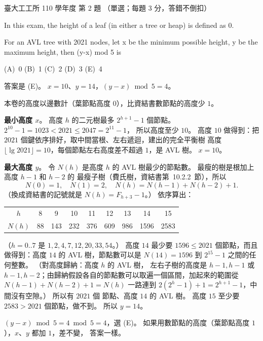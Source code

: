 \begin{pastexam}[label={px:ntu-110-ie-ds-02}]{臺大工工所 110 學年度 第 2 題}
（單選；每題 3 分，答錯不倒扣）

In this exam, the height of a leaf (in either a tree or heap) is defined as 0.

For an AVL tree with 2021 nodes, let x be the minimum possible height, y be the maximum height, then
(y-x) mod 5 is

(A)~0 \qquad (B)~1 \qquad (C)~2 \qquad (D)~3 \qquad (E)~4
\end{pastexam}

\begin{pastsoln}
答案是 (E)。 $x = 10$、$y = 14$，$(y - x) \bmod 5 = 4$。

本卷的高度以邊數計（葉節點高度 $0$），比資結書數節點的高度少 $1$。

\textbf{最小高度 $x$}。 高度 $h$ 的二元樹最多 $2^{h+1} - 1$ 個節點。 $2^{10} - 1 = 1023 < 2021 \le 2047 = 2^{11} - 1$，
所以高度至少 $10$。 高度 $10$ 做得到：把 $2021$ 個鍵依序排好，取中間當根、左右遞迴，建出的完全平衡樹
高度 $\lfloor \lg 2021 \rfloor = 10$，每個節點左右高度差不超過 $1$，是 AVL 樹。 $x = 10$。

\textbf{最大高度 $y$}。 令 $N(h)$ 是高度 $h$ 的 AVL 樹最少的節點數。 最瘦的樹是根加上高度 $h - 1$ 和 $h - 2$ 的
最瘦子樹（費氏樹，資結書第~10.2.2~節），所以
\[
  N(0) = 1,\quad N(1) = 2,\quad N(h) = N(h-1) + N(h-2) + 1 .
\]
（換成資結書的記號就是 $N(h) = F_{h+3} - 1$。） 依序算出：
\begin{center}
\begin{tabular}{c*{8}{c}}
\toprule
$h$ & 8 & 9 & 10 & 11 & 12 & 13 & 14 & 15 \\
$N(h)$ & 88 & 143 & 232 & 376 & 609 & 986 & 1596 & 2583 \\
\bottomrule
\end{tabular}
\end{center}
（$h = 0..7$ 是 $1, 2, 4, 7, 12, 20, 33, 54$。） 高度 $14$ 最少要 $1596 \le 2021$ 個節點，而且做得到：高度 $14$
的 AVL 樹，節點數可以是 $N(14) = 1596$ 到 $2^{15} - 1$ 之間的任何整數。 （對高度歸納：高度 $h$ 的 AVL 樹，
左右子樹的高度是 $h - 1, h - 1$ 或 $h - 1, h - 2$；由歸納假設各自的節點數可以取遍一個區間，加起來的範圍從
$N(h - 1) + N(h - 2) + 1 = N(h)$ 一路連到 $2(2^h - 1) + 1 = 2^{h+1} - 1$，中間沒有空隙。） 所以有 $2021$ 個
節點、高度 $14$ 的 AVL 樹。 高度 $15$ 至少要 $2583 > 2021$ 個節點，做不到。 所以 $y = 14$。

$(y - x) \bmod 5 = 4 \bmod 5 = 4$，選 (E)。 如果用數節點的高度（葉節點高度 $1$），$x$、$y$ 都加 $1$，差不變，
答案一樣。
\end{pastsoln}
